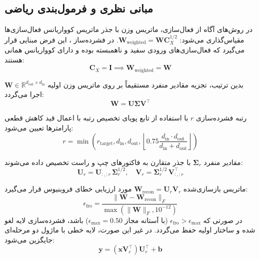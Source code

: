 \subsection{مبانی نظری و فرمول‌بندی ریاضی}
در روش‌های آگاه از فعال‌سازی، ماتریس وزن با جذر ماتریس کوواریانس فعال‌سازی‌ها مقیاس‌گذاری می‌شود: $\mathbf{W}_{\text{weighted}} = \mathbf{W} \mathbf{C}_X^{1/2}$. در فشرده‌ساز ، این فرض مبنایی قرار می‌گیرد که فعال‌سازی‌های ورودی سفید و ناهمبسته بوده و دارای کوواریانس همانی هستند:
\begin{equation}
\mathbf{C}_X = \mathbf{I} \implies \mathbf{W}_{\text{weighted}} = \mathbf{W}
\end{equation}

بدین ترتیب، تجزیه مقادیر منفرد مستقیماً بر روی ماتریس وزن اولیه $\mathbf{W} \in \mathbb{R}^{d_{\text{out}} \times d_{\text{in}}}$ اجرا می‌گردد:
\begin{equation}
\mathbf{W} = \mathbf{U} \mathbf{\Sigma} \mathbf{V}^\top
\end{equation}

رتبه فشرده‌سازی $r$ با استفاده از تابع پویای تخصیص رتبه با اعمال قید کاهش قطعی پارامترها تعیین می‌شود:
\begin{equation}
r = \min\left(r_{\text{target}}, d_{\text{in}}, d_{\text{out}}, \left\lfloor 0.75 \frac{d_{\text{in}} \cdot d_{\text{out}}}{d_{\text{in}} + d_{\text{out}}} \right\rfloor \right)
\end{equation}

مقادیر منفرد $\mathbf{\Sigma}_r$ با جذر متقارن به فاکتورهای چپ و راست تخصیص داده می‌شوند:
\begin{equation}
\mathbf{U}_r = \mathbf{U}_{:, :r} \, \mathbf{\Sigma}_r^{1/2}, \quad \mathbf{V}_r = \mathbf{\Sigma}_r^{1/2} \, \mathbf{V}_{:, :r}^\top
\end{equation}

ماتریس بازسازی‌شده $\mathbf{W}_{\text{recon}} = \mathbf{U}_r \mathbf{V}_r$ مورد ارزیابی خطای فروبنیوس قرار می‌گیرد:
\begin{equation}
\epsilon_{\text{fro}} = \frac{\|\mathbf{W} - \mathbf{W}_{\text{recon}}\|_F}{\max(\|\mathbf{W}\|_F, 10^{-12})}
\end{equation}
در صورتی که $\epsilon_{\text{fro}} > \epsilon_{\text{max}}$ (با آستانه مجاز $\epsilon_{\text{max}} = 0.50$) باشد، فشرده‌سازی لایه لغو شده و ساختار اولیه حفظ می‌گردد. در غیر این صورت، لایه خطی با ماژول دو مرحله‌ای جایگزین می‌شود:
\begin{equation}
\mathbf{y} = (\mathbf{x} \mathbf{V}_r^\top) \mathbf{U}_r^\top + \mathbf{b}
\end{equation}

